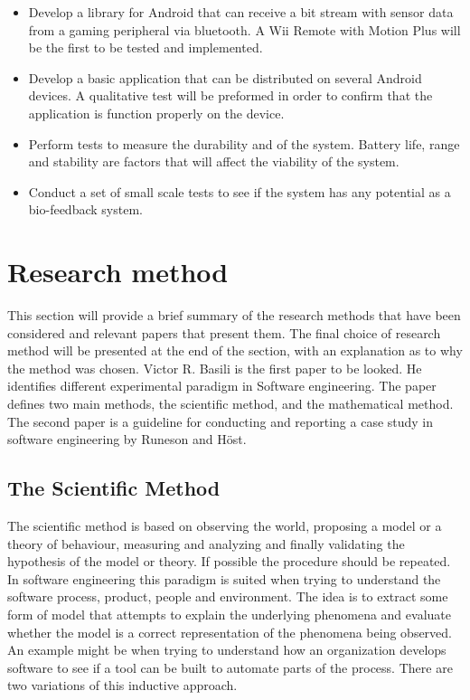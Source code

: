 \begin{itemize}

\item Develop a library for Android that can receive a bit stream with sensor data from a gaming peripheral via bluetooth. A Wii Remote with Motion Plus will be the first to be tested and implemented.

\item Develop a basic application that can be distributed on several Android devices. A qualitative test will be preformed in order to confirm that the application is function properly on the device.

\item Perform tests to measure the durability and of the system. Battery life, range and stability are factors that will affect the viability of the system.

\item Conduct a set of small scale tests to see if the system has any potential as a bio-feedback system.

\end{itemize}


\section{Research method}
This section will provide a brief summary of the research methods that have been considered and relevant papers that present them. The final choice of research method will be presented at the end of the section, with an explanation as to why the method was chosen. Victor R. Basili\cite{paradigm} is the first paper to be looked. He identifies different experimental paradigm in Software engineering. The paper defines two main methods, the scientific method, and the mathematical method. The second paper is a guideline for conducting and reporting a case study in software engineering by Runeson and Höst.


\subsection{The Scientific Method}
The scientific method is based on observing the world, proposing a model or a theory of behaviour, measuring and analyzing and finally validating the hypothesis of the model or theory. If possible the procedure should be repeated. In software engineering this paradigm is suited when trying to understand the software process, product, people and environment. The idea is to extract some form of model that attempts to explain the underlying phenomena and evaluate whether the model is a correct representation of the phenomena being observed. An example might be when trying to understand how an organization develops software to see if a tool can be built to automate parts of the process. There are two variations of this inductive approach.

